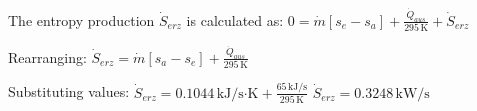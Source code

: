 The entropy production \( \dot{S}_{erz} \) is calculated as:  
\( 0 = \dot{m} [s_e - s_a] + \frac{\dot{Q}_{aus}}{295 \, \text{K}} + \dot{S}_{erz} \)  

Rearranging:  
\( \dot{S}_{erz} = \dot{m} [s_a - s_e] + \frac{\dot{Q}_{aus}}{295 \, \text{K}} \)  

Substituting values:  
\( \dot{S}_{erz} = 0.1044 \, \text{kJ/s·K} + \frac{65 \, \text{kJ/s}}{295 \, \text{K}} \)  
\( \dot{S}_{erz} = 0.3248 \, \text{kW/s} \)